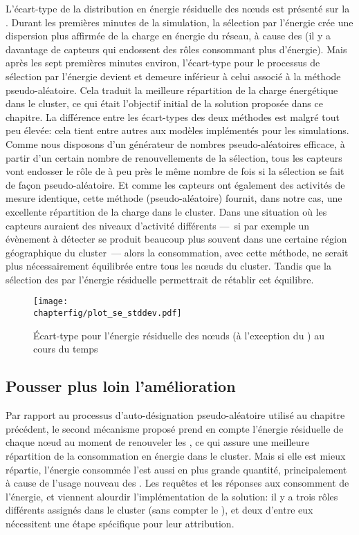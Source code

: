L'écart-type de la distribution en énergie résiduelle des nœuds est présenté sur la .
Durant les premières minutes de la simulation, la sélection par l'énergie crée une dispersion plus affirmée de la charge en énergie du réseau, à cause des \vns (il y a davantage de capteurs qui endossent des rôles consommant plus d'énergie).
Mais après les sept premières minutes environ, l'écart-type pour le processus de sélection par l'énergie devient et demeure inférieur à celui associé à la méthode pseudo-aléatoire.
Cela traduit la meilleure répartition de la charge énergétique dans le cluster, ce qui était l'objectif initial de la solution proposée dans ce chapitre.
La différence entre les écart-types des deux méthodes est malgré tout peu élevée: cela tient entre autres aux modèles implémentés pour les simulations.
Comme nous disposons d'un générateur de nombres pseudo-aléatoires efficace, à partir d'un certain nombre de renouvellements de la sélection, tous les capteurs vont endosser le rôle de \cn à peu près le même nombre de fois si la sélection se fait de façon pseudo-aléatoire.
Et comme les capteurs ont également des activités de mesure identique, cette méthode (pseudo-aléatoire) fournit, dans notre cas, une excellente répartition de la charge dans le cluster.
Dans une situation où les capteurs auraient des niveaux d'activité différents ---~si par exemple un évènement à détecter se produit beaucoup plus souvent dans une certaine région géographique du cluster~--- alors la consommation, avec cette méthode, ne serait plus nécessairement équilibrée entre tous les nœuds du cluster.
Tandis que la sélection des \cns par l'énergie résiduelle permettrait de rétablir cet équilibre.
\begin{figure}[!ht]
    \centering
    \texttt{[image: \\chapterfig/plot\_se\_stddev.pdf]}
    \caption{Écart-type pour l'énergie résiduelle des nœuds (à l'exception du \ch) au cours du temps}\label{se:fig:stddev}
\end{figure}

    \subsection{Pousser plus loin l'amélioration}

Par rapport au processus d'auto-désignation pseudo-aléatoire utilisé au chapitre précédent, le second mécanisme proposé prend en compte l'énergie résiduelle de chaque nœud au moment de renouveler les \cns, ce qui assure une meilleure répartition de la consommation en énergie dans le cluster.
Mais si elle est mieux répartie, l'énergie consommée l'est aussi en plus grande quantité, principalement à cause de l'usage nouveau des \vns.
Les requêtes et les réponses aux \cns consomment de l'énergie, et viennent alourdir l'implémentation de la solution: il y a trois rôles différents assignés dans le cluster (sans compter le \ch), et deux d'entre eux nécessitent une étape spécifique pour leur attribution.

